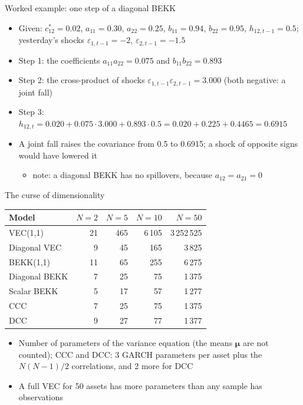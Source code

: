 \begin{frame}{Worked example: one step of a diagonal BEKK}
\itemsize{\small}
\begin{itemize}
    \item Given: $c_{12}^* = 0.02$, $a_{11} = 0.30$, $a_{22} = 0.25$, $b_{11} = 0.94$, $b_{22} = 0.95$, $h_{12,t-1} = 0.5$; yesterday's shocks $\varepsilon_{1,t-1} = -2$, $\varepsilon_{2,t-1} = -1.5$
    \item Step 1: the coefficients $a_{11}a_{22} = 0.075$ and $b_{11}b_{22} = 0.893$
    \item Step 2: the cross-product of shocks $\varepsilon_{1,t-1}\varepsilon_{2,t-1} = 3.000$ (both negative: a joint fall)
    \item Step 3: $h_{12,t} = 0.020 + 0.075 \cdot 3.000 + 0.893 \cdot 0.5 = 0.020 + 0.225 + 0.4465 = 0.6915$
    \item A joint fall raises the covariance from 0.5 to 0.6915; a shock of opposite signs would have lowered it
    \begin{itemize}
        \item note: a diagonal BEKK has no spillovers, because $a_{12} = a_{21} = 0$
    \end{itemize}
\end{itemize}
\end{frame}

\begin{frame}{The curse of dimensionality}
\itemsize{\footnotesize}
\begin{center}
\small
\begin{tabular}{lrrrr}
\toprule
\textbf{Model} & $N = 2$ & $N = 5$ & $N = 10$ & $N = 50$ \\
\midrule
VEC(1,1) & 21 & 465 & 6\,105 & 3\,252\,525 \\
Diagonal VEC & 9 & 45 & 165 & 3\,825 \\
BEKK(1,1) & 11 & 65 & 255 & 6\,275 \\
Diagonal BEKK & 7 & 25 & 75 & 1\,375 \\
Scalar BEKK & 5 & 17 & 57 & 1\,277 \\
CCC & 7 & 25 & 75 & 1\,375 \\
DCC & 9 & 27 & 77 & 1\,377 \\
\bottomrule
\end{tabular}
\end{center}
\begin{itemize}
    \item Number of parameters of the variance equation (the means $\boldsymbol{\mu}$ are not counted); CCC and DCC: 3 GARCH parameters per asset plus the $N(N-1)/2$ correlations, and 2 more for DCC
    \item A full VEC for 50 assets has more parameters than any sample has observations
\end{itemize}
\end{frame}

